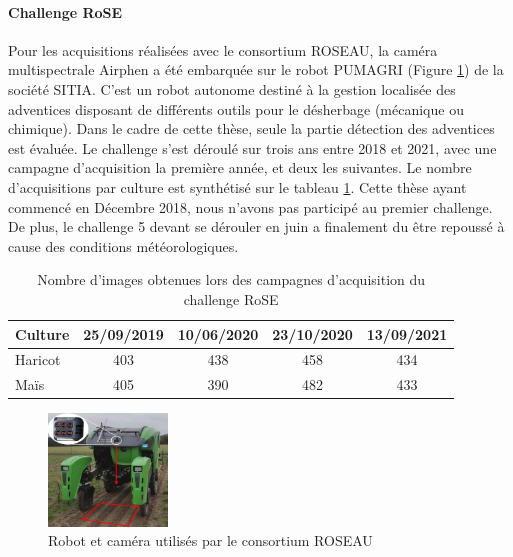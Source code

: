 \documentclass[../thesis.tex]{subfiles}
\begin{document}
    \paragraph{Challenge RoSE}
    
    Pour les acquisitions réalisées avec le consortium ROSEAU, la caméra multispectrale Airphen a été embarquée sur le robot PUMAGRI (Figure \ref{fig:04-robot-xp}) de la société SITIA. C'est un robot autonome destiné à la gestion localisée des adventices disposant de différents outils pour le désherbage (mécanique ou chimique). Dans le cadre de cette thèse, seule la partie détection des adventices est évaluée. Le challenge s'est déroulé sur trois ans entre 2018 et 2021, avec une campagne d'acquisition la première année, et deux les suivantes. Le nombre d'acquisitions par culture est synthétisé sur le tableau \ref{tab:04-acquisition-challenge}. Cette thèse ayant commencé en Décembre 2018, nous n'avons pas participé au premier challenge. De plus, le challenge 5 devant se dérouler en juin a finalement du être repoussé à cause des conditions météorologiques.
    
    \begin{table}[H]
        \centering
        \begin{tabular}{l c c c c}
            \hline \textbf{Culture} & \textbf{25/09/2019} & \textbf{10/06/2020} & \textbf{23/10/2020} & \textbf{13/09/2021} \\ \hline
            Haricot 	& 403 & 438 & 458 & 434 \\
            Maïs  		& 405 & 390 & 482 & 433 \\ \hline
        \end{tabular}
        \caption{Nombre d'images obtenues lors des campagnes d'acquisition du challenge RoSE}
        \label{tab:04-acquisition-challenge}
    \end{table}
    
    \begin{figure}[H]
        \centering
        \includegraphics[height=3cm]{img/material/trektor}
        \caption{Robot et caméra utilisés par le consortium ROSEAU}
        \label{fig:04-robot-xp}
    \end{figure}
    
\end{document}
